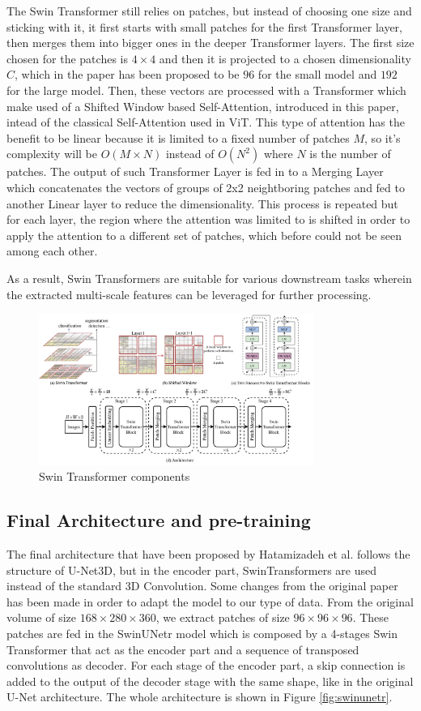 The Swin Transformer still relies on patches, but instead of choosing one size
and sticking with it, it first starts with small patches for the first
Transformer layer, then merges them into bigger ones in the deeper Transformer
layers. The first size chosen for the patches is $4 \times 4$ and then it is
projected to a chosen dimensionality $C$, which in the paper has been proposed
to be $96$ for the small model and $192$ for the large model. Then, these
vectors are processed with a Transformer which make used of a Shifted Window
based Self-Attention, introduced in this paper, intead of the classical
Self-Attention used in ViT. This type of attention has the benefit to be linear
because it is limited to a fixed number of patches $M$, so it's complexity will
be $O(M \times N)$ instead of $O(N^2)$ where $N$ is the number of patches.
The output of such Transformer Layer is fed in to a Merging Layer which
concatenates the vectors of groups of 2x2 neightboring patches and fed to
another Linear layer to reduce the dimensionality.
This process is repeated but for each layer, the region where the attention was
limited to is shifted in order to apply the attention to a different set of
patches, which before could not be seen among each other.

As a result, Swin Transformers are suitable for various downstream tasks wherein
the extracted multi-scale features can be leveraged for further processing.
\begin{figure}[ht!]
  \centering
  \includegraphics[width=0.8\textwidth]{Images/SwinTransformer.png}
  \caption{Swin Transformer components}
  \label{fig:swintransformer}
\end{figure}

\subsection{Final Architecture and pre-training}
The final architecture that have been proposed by Hatamizadeh et al. follows the
structure of U-Net3D, but in the encoder part, SwinTransformers are used instead
of the standard 3D Convolution. Some changes from the original paper has been
made in order to adapt the model to our type of data.
From the original volume of size $168 \times 280 \times 360$, we extract patches
of size $96 \times 96 \times 96$. These patches are fed in the SwinUNetr model
which is composed by a 4-stages Swin Transformer that act as the encoder part
and a sequence of transposed convolutions as decoder. For each stage of the
encoder part, a skip connection is added to the output of the decoder stage with
the same shape, like in the original U-Net architecture. The whole architecture
is shown in Figure \ref{fig:swinunetr}.

